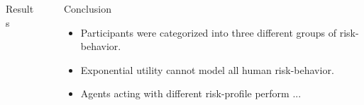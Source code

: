 \documentclass[final]{beamer}
\newlength{\sepwid}
\newlength{\onecolwid}
\begin{document}
\begin{frame}
\begin{columns}[t]
\begin{column}{\onecolwid}
\begin{exampleblock}{Results}



\end{exampleblock}


\end{column} %

\begin{column}{\sepwid}\end{column} %

\begin{column}{\onecolwid} %









\begin{exampleblock}{Conclusion}

\begin{itemize}
    \item Participants were categorized into three different groups of risk-behavior.
    \item Exponential utility cannot model all human risk-behavior.
    \item Agents acting with different risk-profile perform ... 
\end{itemize}


\end{exampleblock}
\end{column}
\end{columns}
\end{frame}
\end{document}
